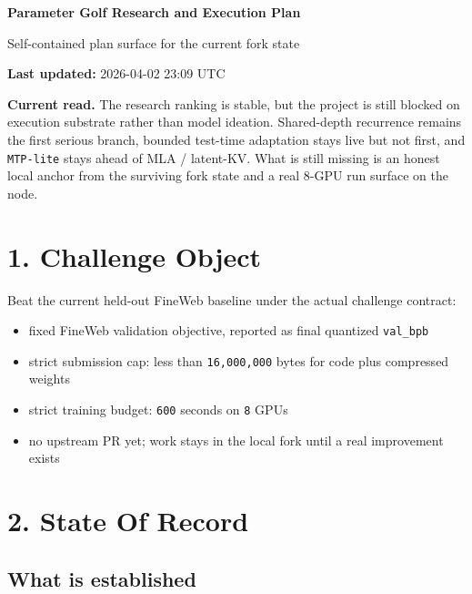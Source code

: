 \documentclass[11pt]{article}
\begin{document}
{\Large\bfseries\textcolor{PlanBlue}{Parameter Golf Research and Execution Plan}}

{\large Self-contained plan surface for the current fork state}

\textbf{Last updated:} 2026-04-02 23:09 UTC

\vspace{0.6em}
\noindent
\colorbox{PlanLite}{%
    \parbox{\dimexpr\linewidth-2\fboxsep\relax}{%
        \textbf{Current read.}
        The research ranking is stable, but the project is still blocked on execution substrate rather than model ideation.
        Shared-depth recurrence remains the first serious branch, bounded test-time adaptation stays live but not first, and \texttt{MTP-lite} stays ahead of MLA / latent-KV.
        What is still missing is an honest local anchor from the surviving fork state and a real 8-GPU run surface on the node.
    }%
}

\section*{1. Challenge Object}

Beat the current held-out FineWeb baseline under the actual challenge contract:

\begin{itemize}
    \item fixed FineWeb validation objective, reported as final quantized \texttt{val\_bpb}
    \item strict submission cap: less than \texttt{16,000,000} bytes for code plus compressed weights
    \item strict training budget: \texttt{600} seconds on \texttt{8} GPUs
    \item no upstream PR yet; work stays in the local fork until a real improvement exists
\end{itemize}

\section*{2. State Of Record}

\subsection*{What is established}
\end{document}

